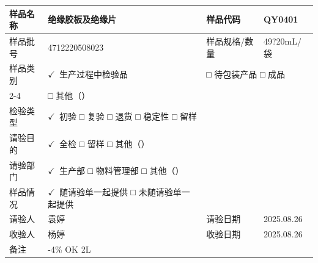 \documentclass[UTF8,10pt,a4paper,fontset=fandol]{ctexart}
\newcommand{\fieldvalue}[1]{#1}
\newcommand{\handwritten}[1]{#1}
\begin{document}
\begin{tabularx}{\textwidth}{|p{2.5cm}|X|p{2.8cm}|X|}
\hline
\centering 样品名称 &
\fieldvalue{\handwritten{绝缘胶板及绝缘片}} &
\centering 样品代码 &
\fieldvalue{\handwritten{QY0401}}
\\
\hline
\centering 样品批号 &
\fieldvalue{\handwritten{4712220508023}} &
\centering 样品规格/数量 &
\fieldvalue{\handwritten{49?20mL/袋}}
\\
\hline
\centering 样品类别 &
\fieldvalue{\ensuremath{\checkmark}\ 生产过程中检验品}
&
\multicolumn{2}{l|}{\quad □ 待包装产品 \qquad □ 成品}\\
\cline{2-4}
& \multicolumn{3}{l|}{\quad □ 其他（\hspace{3cm}）}\\
\hline
\centering 检验类型 &
\fieldvalue{\ensuremath{\checkmark}\ 初验}
\quad □ 复验 \quad □ 退货 \quad □ 稳定性 \quad □ 留样
& &\\
\hline
\centering 请验目的 &
\fieldvalue{\ensuremath{\checkmark}\ 全检}
\quad □ 留样 \quad □ 其他（\hspace{3cm}）
& &\\
\hline
\centering 请验部门 &
\fieldvalue{\ensuremath{\checkmark}\ 生产部}
\quad □ 物料管理部 \quad □ 其他（\hspace{3cm}）
& &\\
\hline
\centering 样品情况 &
\fieldvalue{\ensuremath{\checkmark}\ 随请验单一起提供}
\quad □ 未随请验单一起提供
& &\\
\hline
\centering 请验人 &
\fieldvalue{\handwritten{袁婷}}
&
\centering 请验日期 &
\fieldvalue{\handwritten{2025.08.26}}
\\
\hline
\centering 收验人 &
\fieldvalue{\handwritten{杨婷}}
&
\centering 收验日期 &
\fieldvalue{\handwritten{2025.08.26}}
\\
\hline
\centering 备注 &
\fieldvalue{\handwritten{-4\% \quad OK \quad 2L}}
& \multicolumn{2}{l|}{}\\
\hline
\end{tabularx}
\end{document}
